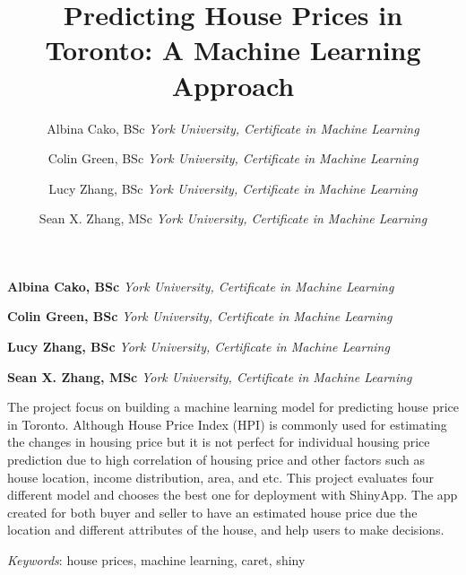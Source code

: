 \documentclass[11pt,]{article}
\title{Predicting House Prices in Toronto: A Machine Learning Approach  }
\author{\Large Albina Cako, BSc\vspace{0.05in} \newline\normalsize\emph{York University, Certificate in Machine Learning}   \and \Large Colin Green, BSc\vspace{0.05in} \newline\normalsize\emph{York University, Certificate in Machine Learning}   \and \Large Lucy Zhang, BSc\vspace{0.05in} \newline\normalsize\emph{York University, Certificate in Machine Learning}   \and \Large Sean X. Zhang, MSc\vspace{0.05in} \newline\normalsize\emph{York University, Certificate in Machine Learning}  }
\date{}
\newcommand*{\authorfont}{\fontfamily{phv}\selectfont}
\renewenvironment{abstract}
 {{%
    \setlength{\leftmargin}{0mm}
    \setlength{\rightmargin}{\leftmargin}%
  }%
  \relax}
 {\endlist}
\begin{document}
	
%

{%
\setlength{\parindent}{0pt}
\thispagestyle{plain}
{\fontsize{18}{20}\selectfont\raggedright 
\maketitle  %

}

{
   \vskip 13.5pt\relax \normalsize\fontsize{11}{12} 
\textbf{\authorfont Albina Cako, BSc} \hskip 15pt \emph{\small York University, Certificate in Machine Learning}   \par \textbf{\authorfont Colin Green, BSc} \hskip 15pt \emph{\small York University, Certificate in Machine Learning}   \par \textbf{\authorfont Lucy Zhang, BSc} \hskip 15pt \emph{\small York University, Certificate in Machine Learning}   \par \textbf{\authorfont Sean X. Zhang, MSc} \hskip 15pt \emph{\small York University, Certificate in Machine Learning}   

}

}








\begin{abstract}

    \hbox{\vrule height .2pt width 39.14pc}

    \vskip 8.5pt %

\noindent The project focus on building a machine learning model for predicting
house price in Toronto. Although House Price Index (HPI) is commonly
used for estimating the changes in housing price but it is not perfect
for individual housing price prediction due to high correlation of
housing price and other factors such as house location, income
distribution, area, and etc. This project evaluates four different model
and chooses the best one for deployment with ShinyApp. The app created
for both buyer and seller to have an estimated house price due the
location and different attributes of the house, and help users to make
decisions.


\vskip 8.5pt \noindent \emph{Keywords}: house prices, machine learning, caret, shiny \par

    \hbox{\vrule height .2pt width 39.14pc}



\end{abstract}
\end{document}
